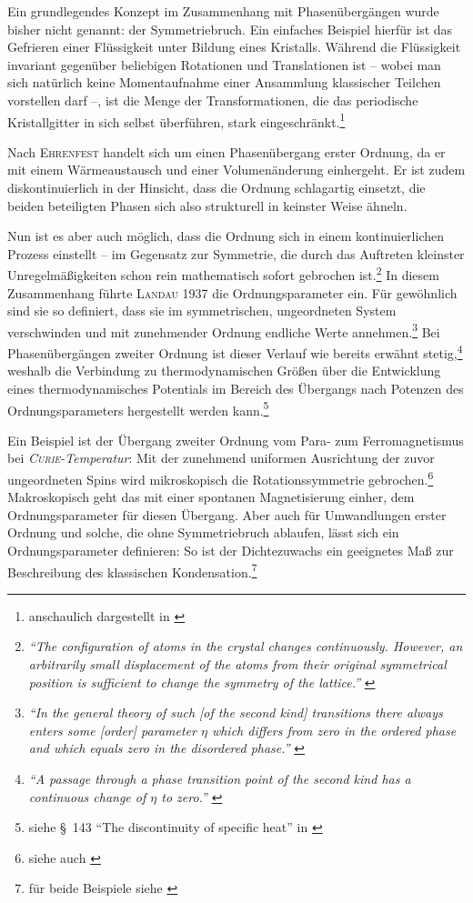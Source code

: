 \documentclass[a4paper, 10pt, twoside, openany]{book} %
\begin{document}
	Ein grundlegendes Konzept im Zusammenhang mit Phasenübergängen wurde bisher nicht genannt: der Symmetriebruch. Ein einfaches Beispiel hierfür ist das Gefrieren einer Flüssigkeit unter Bildung eines Kristalls. Während die Flüssigkeit invariant gegenüber beliebigen Rotationen und Translationen ist -- wobei man sich natürlich keine Momentaufnahme einer Ansammlung klassischer Teilchen vorstellen darf --, ist die Menge der Transformationen, die das periodische Kristallgitter in sich selbst überführen, stark eingeschränkt.\footnote{anschaulich dargestellt in \cite[S.~2]{Sethna}}
	
	Nach \textsc{Ehrenfest} handelt sich um einen Phasenübergang erster Ordnung, da er mit einem Wärmeaustausch und einer Volumenänderung einhergeht. Er ist zudem diskontinuierlich in der Hinsicht, dass die Ordnung schlagartig einsetzt, die beiden beteiligten Phasen sich also strukturell in keinster Weise ähneln.
	
	Nun ist es aber auch möglich, dass die Ordnung sich in einem kontinuierlichen Prozess einstellt -- im Gegensatz zur Symmetrie, die durch das Auftreten kleinster Unregelmäßigkeiten schon rein mathematisch sofort gebrochen ist.\footnote{\emph{"`The configuration of atoms in the crystal changes continuously. However, an arbitrarily small displacement of the atoms from their original symmetrical position is sufficient to change the symmetry of the lattice."'} \cite[S.~447]{Landau2}} In diesem Zusammenhang führte \textsc{Landau} 1937 die Ordnungsparameter ein. Für gewöhnlich sind sie so definiert, dass sie im symmetrischen, ungeordneten System verschwinden und mit zunehmender Ordnung endliche Werte annehmen.\footnote{\emph{"`In the general theory of such \emph{[of the second kind]} transitions there always enters some \emph{[order]} parameter $\eta$ which differs from zero in the ordered phase and which equals zero in the disordered phase."'} \cite[S.~546]{Landau1}} Bei Phasenübergängen zweiter Ordnung ist dieser Verlauf wie bereits erwähnt stetig,\footnote{\emph{"`A passage through a phase transition point of the second kind has a continuous change of $\eta$ to zero."'} \cite[S.~450]{Landau2}} weshalb die Verbindung zu thermodynamischen Größen über die Entwicklung eines thermodynamisches Potentials im Bereich des Übergangs nach Potenzen des Ordnungsparameters hergestellt werden kann.\footnote{siehe \S~143 "`The discontinuity of specific heat"' in \cite[S.~451ff]{Landau2}}
	
	Ein Beispiel ist der Übergang zweiter Ordnung vom Para- zum Ferromagnetismus bei \emph{\textsc{Curie}-Temperatur}: Mit der zunehmend uniformen Ausrichtung der zuvor ungeordneten Spins wird mikroskopisch die Rotationssymmetrie gebrochen.\footnote{siehe auch \cite[S.~3]{Sethna}} Makroskopisch geht das mit einer spontanen Magnetisierung einher, dem Ordnungsparameter für diesen Übergang. Aber auch für Umwandlungen erster Ordnung und solche, die ohne Symmetriebruch ablaufen, lässt sich ein Ordnungsparameter definieren: So ist der Dichtezuwachs ein geeignetes Maß zur Beschreibung des klassischen Kondensation.\footnote{für beide Beispiele siehe \cite[S.~324 bzw. 314]{Fliessbach}}
	
\end{document}
